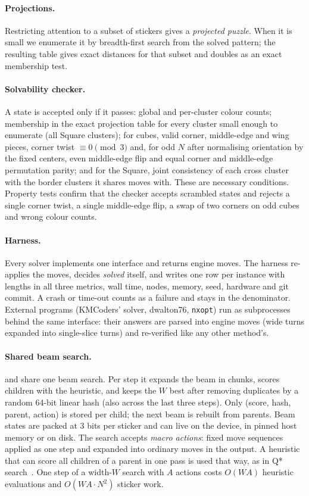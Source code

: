 \paragraph{Projections.}
Restricting attention to a subset of stickers gives a \emph{projected puzzle}. When it is small we enumerate it by
breadth-first search from the solved pattern; the resulting table gives exact distances for that subset and doubles
as an exact membership test.

\paragraph{Solvability checker.}
A state is accepted only if it passes: global and per-cluster colour counts; membership in the exact projection table
for every cluster small enough to enumerate (all Square clusters); for cubes, valid corner, middle-edge and wing pieces,
corner twist $\equiv 0 \pmod 3$ and, for odd $N$ after normalising orientation by the fixed centers, even middle-edge
flip and equal corner and middle-edge permutation parity; and for the Square, joint consistency of each cross cluster
with the border clusters it shares moves with. These are necessary conditions. Property tests confirm that the checker
accepts scrambled states and rejects a single corner twist, a single middle-edge flip, a swap of two corners on odd
cubes and wrong colour counts.

\paragraph{Harness.}
Every solver implements one interface and returns engine moves. The harness re-applies the moves, decides
\emph{solved} itself, and writes one row per instance with lengths in all three metrics, wall time, nodes, memory,
seed, hardware and git commit. A crash or time-out counts as a failure and stays in the denominator. External programs
(KMCoders' solver, dwalton76, \texttt{nxopt}) run as subprocesses behind the same interface: their answers are parsed
into engine moves (wide turns expanded into single-slice turns) and re-verified like any other method's.

\paragraph{Shared beam search.}
\Mfour and \FiveA share one beam search. Per step it expands the beam in chunks, scores children with the
heuristic, and keeps the $W$ best after removing duplicates by a random 64-bit linear hash (also across the last three
steps). Only (score, hash, parent, action) is stored per child; the next beam is rebuilt from parents. Beam states are
packed at 3 bits per sticker and can live on the device, in pinned host memory or on disk. The search accepts
\emph{macro actions}: fixed move sequences applied as one step and expanded into ordinary moves in the output. A
heuristic that can score all children of a parent in one pass is used that way, as in Q* search~\cite{agostinelli2024qstar}.
One step of a width-$W$ search with $A$ actions costs $O(WA)$ heuristic evaluations and $O(WA\cdot N^2)$ sticker work.

